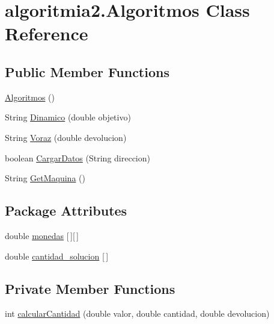 \hypertarget{classalgoritmia2_1_1_algoritmos}{}\section{algoritmia2.\+Algoritmos Class Reference}
\label{classalgoritmia2_1_1_algoritmos}
\subsection*{Public Member Functions}
\begin{DoxyCompactItemize}
\item 
\mbox{\hyperlink{classalgoritmia2_1_1_algoritmos_af7746e9d1d89571233f5e9f05a429603}{Algoritmos}} ()
\item 
String \mbox{\hyperlink{classalgoritmia2_1_1_algoritmos_a2c967334e82887c7721130ef06e4fe7c}{Dinamico}} (double objetivo)
\item 
String \mbox{\hyperlink{classalgoritmia2_1_1_algoritmos_a5bfcbe069e929caf3bfd11e8eedbda43}{Voraz}} (double devolucion)
\item 
boolean \mbox{\hyperlink{classalgoritmia2_1_1_algoritmos_ab5d2d8385a30626622b05e83e9c1cd41}{Cargar\+Datos}} (String direccion)
\item 
String \mbox{\hyperlink{classalgoritmia2_1_1_algoritmos_a0cefec1635c58223a5921e84a58e7bfe}{Get\+Maquina}} ()
\end{DoxyCompactItemize}
\subsection*{Package Attributes}
\begin{DoxyCompactItemize}
\item 
double \mbox{\hyperlink{classalgoritmia2_1_1_algoritmos_a7c670acfc4ef3b85c2e6908773014a13}{monedas}} \mbox{[}$\,$\mbox{]}\mbox{[}$\,$\mbox{]}
\item 
double \mbox{\hyperlink{classalgoritmia2_1_1_algoritmos_abd99d9577b6325dc7503394ca443a103}{cantidad\+\_\+solucion}} \mbox{[}$\,$\mbox{]}
\end{DoxyCompactItemize}
\subsection*{Private Member Functions}
\begin{DoxyCompactItemize}
\item 
int \mbox{\hyperlink{classalgoritmia2_1_1_algoritmos_ae8d80e3ad2158cb6743bafa0ebbbe3bb}{calcular\+Cantidad}} (double valor, double cantidad, double devolucion)
\end{DoxyCompactItemize}
